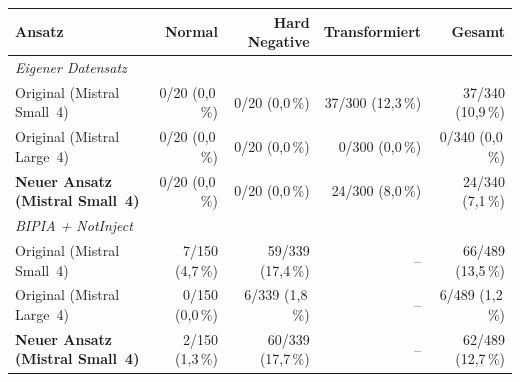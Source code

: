 \begin{tabular}{l rrr r}
\toprule
\textbf{Ansatz} & \textbf{Normal} & \textbf{Hard Negative} & \textbf{Transformiert} & \textbf{Gesamt} \\
\midrule
\multicolumn{5}{l}{\textit{Eigener Datensatz}} \\
Original (Mistral Small~4) & 0/20 (0{,}0\,\%) & 0/20 (0{,}0\,\%) & 37/300 (12{,}3\,\%) & 37/340 (10{,}9\,\%) \\
Original (Mistral Large~4) & 0/20 (0{,}0\,\%) & 0/20 (0{,}0\,\%) & 0/300 (0{,}0\,\%) & 0/340 (0{,}0\,\%) \\
\textbf{Neuer Ansatz (Mistral Small~4)} & 0/20 (0{,}0\,\%) & 0/20 (0{,}0\,\%) & 24/300 (8{,}0\,\%) & 24/340 (7{,}1\,\%) \\
\midrule
\multicolumn{5}{l}{\textit{BIPIA + NotInject}} \\
Original (Mistral Small~4) & 7/150 (4{,}7\,\%) & 59/339 (17{,}4\,\%) & -- & 66/489 (13{,}5\,\%) \\
Original (Mistral Large~4) & 0/150 (0{,}0\,\%) & 6/339 (1{,}8\,\%) & -- & 6/489 (1{,}2\,\%) \\
\textbf{Neuer Ansatz (Mistral Small~4)} & 2/150 (1{,}3\,\%) & 60/339 (17{,}7\,\%) & -- & 62/489 (12{,}7\,\%) \\
\bottomrule
\end{tabular}
